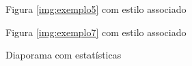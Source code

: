 \documentclass[11pt,a4paper]{report}
\begin{document}
\begin{figure}[H]
\centering
{}
\caption{Figura \ref{img:exemplo5} com estilo associado}
\label{img:exemplo6}
\end{figure}

\begin{figure}[H]
\centering
{}
\caption{Figura \ref{img:exemplo7} com estilo associado}
\label{img:exemplo8}
\end{figure}

\begin{figure}[H]
\centering
{}
\caption{Diaporama com estatísticas}
\label{img:exemplo9}
\end{figure}
\end{document}
